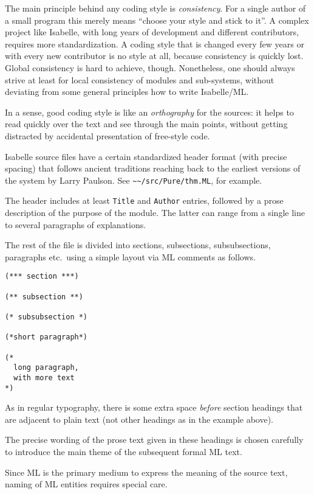 \begin{isabellebody}
\begin{isamarkuptext}
  The main principle behind any coding style is \emph{consistency}.
  For a single author of a small program this merely means ``choose
  your style and stick to it''.  A complex project like Isabelle, with
  long years of development and different contributors, requires more
  standardization.  A coding style that is changed every few years or
  with every new contributor is no style at all, because consistency
  is quickly lost.  Global consistency is hard to achieve, though.
  Nonetheless, one should always strive at least for local consistency
  of modules and sub-systems, without deviating from some general
  principles how to write Isabelle/ML.

  In a sense, good coding style is like an \emph{orthography} for the
  sources: it helps to read quickly over the text and see through the
  main points, without getting distracted by accidental presentation
  of free-style code.%
\end{isamarkuptext}%
\isamarkuptrue%
%
\isamarkuptrue%
%
\begin{isamarkuptext}%
Isabelle source files have a certain standardized header
  format (with precise spacing) that follows ancient traditions
  reaching back to the earliest versions of the system by Larry
  Paulson.  See \verb|~~/src/Pure/thm.ML|, for example.

  The header includes at least \verb|Title| and \verb|Author| entries, followed by a prose description of the purpose of
  the module.  The latter can range from a single line to several
  paragraphs of explanations.

  The rest of the file is divided into sections, subsections,
  subsubsections, paragraphs etc.\ using a simple layout via ML
  comments as follows.

\begin{verbatim}
(*** section ***)

(** subsection **)

(* subsubsection *)

(*short paragraph*)

(*
  long paragraph,
  with more text
*)
\end{verbatim}

  As in regular typography, there is some extra space \emph{before}
  section headings that are adjacent to plain text (not other headings
  as in the example above).

  \medskip The precise wording of the prose text given in these
  headings is chosen carefully to introduce the main theme of the
  subsequent formal ML text.%
\end{isamarkuptext}%
\isamarkuptrue%
%
\isamarkuptrue%
%
\begin{isamarkuptext}%
Since ML is the primary medium to express the meaning of the
  source text, naming of ML entities requires special care.


\end{isamarkuptext}
\end{isabellebody}
